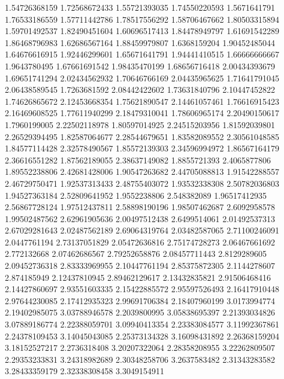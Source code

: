   1.54726368159    1.72568672433
  1.55721393035    1.74550220593
   1.5671641791    1.76533186559
  1.57711442786    1.78517556292
  1.58706467662    1.80503315894
  1.59701492537    1.82490451604
  1.60696517413    1.84478949797
  1.61691542289    1.86468796983
  1.62686567164    1.88459979807
   1.6368159204    1.90452485044
  1.64676616915    1.92446299601
  1.65671641791    1.94441410515
  1.66666666667     1.9643780495
  1.67661691542    1.98435470199
  1.68656716418    2.00434393679
  1.69651741294    2.02434562932
  1.70646766169    2.04435965625
  1.71641791045    2.06438589545
   1.7263681592    2.08442422602
  1.73631840796    2.10447452822
  1.74626865672    2.12453668354
  1.75621890547    2.14461057461
  1.76616915423    2.16469608525
  1.77611940299    2.18479310041
  1.78606965174    2.20490150617
   1.7960199005    2.22502118978
  1.80597014925    2.24515203956
  1.81592039801    2.26529394495
  1.82587064677    2.28544679651
  1.83582089552    2.30561048585
  1.84577114428    2.32578490567
  1.85572139303    2.34596994972
  1.86567164179    2.36616551282
  1.87562189055    2.38637149082
   1.8855721393     2.4065877806
  1.89552238806    2.42681428006
  1.90547263682    2.44705088813
  1.91542288557    2.46729750471
  1.92537313433    2.48755403072
  1.93532338308    2.50782036803
  1.94527363184    2.52809641952
   1.9552238806      2.548382089
  1.96517412935    2.56867728124
  1.97512437811    2.58898190196
  1.98507462687     2.6092958578
  1.99502487562    2.62961905636
  2.00497512438     2.6499514061
  2.01492537313    2.67029281643
  2.02487562189    2.69064319764
  2.03482587065    2.71100246091
   2.0447761194    2.73137051829
  2.05472636816    2.75174728273
  2.06467661692      2.772132668
  2.07462686567    2.79252658876
  2.08457711443     2.8129289605
  2.09452736318    2.83333969955
  2.10447761194    2.85375872305
   2.1144278607      2.874185949
  2.12437810945    2.89462129617
  2.13432835821    2.91506468416
  2.14427860697    2.93551603335
  2.15422885572    2.95597526493
  2.16417910448    2.97644230085
  2.17412935323    2.99691706384
  2.18407960199     3.0173994774
  2.19402985075    3.03788946578
   2.2039800995    3.05838695397
  2.21393034826    3.07889186774
  2.22388059701    3.09940413354
  2.23383084577    3.11992367861
  2.24378109453    3.14045043085
  2.25373134328    3.16098431892
  2.26368159204    3.18152527217
   2.2736318408    3.20207322064
  2.28358208955    3.22262809507
  2.29353233831    3.24318982689
  2.30348258706     3.2637583482
  2.31343283582    3.28433359179
  2.32338308458     3.3049154911
